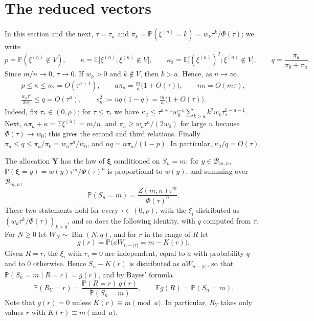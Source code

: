 \documentclass[11pt]{amsart}
\theoremstyle{definition}
\theoremstyle{remark}
\numberwithin{equation}{section}
\newcommand{\Pp}{\mathbb P}
\newcommand{\E}{\mathbb E}
\newcommand{\cB}{\mathcal B}
\newcommand{\bY}{\mathbf Y}
\newcommand{\bxi}{\boldsymbol\xi}
\DeclareMathOperator{\Bin}{Bin}
\begin{document}
\section{The reduced vectors}\label{sec:record}

In this section and the next, $\tau=\tau_n$ and $\pi_k=\Pp(\xi^{(n)}=k)=w_k\tau^k/\Phi(\tau)$; we write
\[
p=\Pp(\xi^{(n)}\notin V),\qquad\kappa=\E\bigl[\xi^{(n)};\xi^{(n)}\notin V\bigr],\qquad\kappa_2=\E\bigl[(\xi^{(n)})^2;\xi^{(n)}\notin V\bigr],\qquad q=\frac{\pi_a}{\pi_0+\pi_a}.
\]
Since $m/n\to0$, $\tau\to0$. If $w_k>0$ and $k\notin V$, then $k>a$. Hence, as $n\to\infty$,
\begin{equation}\label{eq:asym}
\begin{gathered}
p\le\kappa\le\kappa_2=O(\tau^{a+1}),\qquad a\pi_a=\frac mn\bigl(1+O(\tau)\bigr),\qquad n\kappa=O(m\tau),\\
\frac{w_a\tau^a}{2w_0}\le q=O(\tau^a),\qquad s_n^2:=nq(1-q)=\frac ma\bigl(1+O(\tau)\bigr).
\end{gathered}
\end{equation}
Indeed, fix $\tau_*\in(0,\rho)$; for $\tau\le\tau_*$ we have $\kappa_2\le\tau^{a+1}w_0^{-1}\sum_{k>a}k^2w_k\tau_*^{k-a-1}$. Next, $a\pi_a+\kappa=\E\xi^{(n)}=m/n$, and $\pi_a\ge w_a\tau^a/(2w_0)$ for large $n$ because $\Phi(\tau)\to w_0$; this gives the second and third relations. Finally $\pi_a\le q\le\pi_a/\pi_0=w_a\tau^a/w_0$, and $nq=n\pi_a/(1-p)$. In particular, $\kappa_2/q=O(\tau)$.

The allocation $\bY$ has the law of $\bxi$ conditioned on $S_n=m$: for $y\in\cB_{m,n}$, $\Pp(\bxi=y)=w(y)\tau^m/\Phi(\tau)^n$ is proportional to $w(y)$, and summing over $\cB_{m,n}$,
\[
\Pp(S_n=m)=\frac{Z(m,n)\tau^m}{\Phi(\tau)^n}.
\]
These two statements hold for every $\tau\in(0,\rho)$, with the $\xi_i$ distributed as $(w_k\tau^k/\Phi(\tau))_{k\ge0}$, and so does the following identity, with $q$ computed from $\tau$. For $N\ge0$ let $W_N\sim\Bin(N,q)$, and for $r$ in the range of $R$ let
\[
g(r)=\Pp\bigl(aW_{n-|r|}=m-K(r)\bigr).
\]
Given $R=r$, the $\xi_i$ with $r_i=0$ are independent, equal to $a$ with probability $q$ and to $0$ otherwise. Hence $S_n-K(r)$ is distributed as $aW_{n-|r|}$, so that $\Pp(S_n=m\mid R=r)=g(r)$, and by Bayes' formula
\begin{equation}\label{eq:id}
\Pp(R_Y=r)=\frac{\Pp(R=r)\,g(r)}{\Pp(S_n=m)},\qquad\E g(R)=\Pp(S_n=m).
\end{equation}
Note that $g(r)=0$ unless $K(r)\equiv m\pmod a$. In particular, $R_Y$ takes only values $r$ with $K(r)\equiv m\pmod a$.
\end{document}
